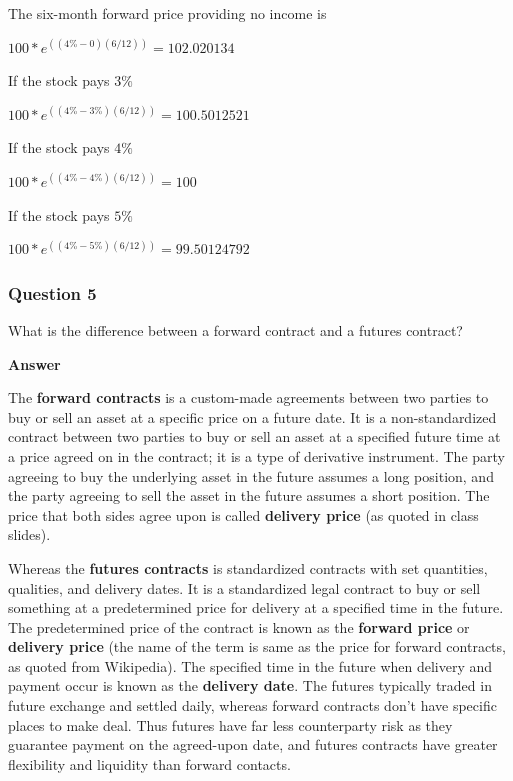 \documentclass[margin=1in]{article}
\begin{document}
		  The six-month forward price providing no income is
		  
		  $100*e^{((4\%-0)(6/12))}=102.020134$
		  
		  If the stock pays $3\%$
		  
		  $100*e^{((4\%-3\%)(6/12))}=100.5012521$
		  
		   If the stock pays $4\%$
		  
		  $100*e^{((4\%-4\%)(6/12))}=100$
		  
		   If the stock pays $5\%$
		  
		  $100*e^{((4\%-5\%)(6/12))}=99.50124792$
		  
		   \pagebreak
		  \subsubsection*{Question 5}
		  What is the difference between a forward contract and a futures contract?
		  
		  \textbf{Answer}
		  
		  The \textbf{forward contracts} is a custom-made agreements between two parties to buy or sell an asset at a specific price on a future date. It is a non-standardized contract between two parties to buy or sell an asset at a specified future time at a price agreed on in the contract; it is a type of derivative instrument. The party agreeing to buy the underlying asset in the future assumes a long position, and the party agreeing to sell the asset in the future assumes a short position. The price that both sides agree upon is called \textbf{delivery price} (as quoted in class slides).
		  
		  Whereas the \textbf{futures contracts} is standardized contracts with set quantities, qualities, and delivery dates. It is a standardized legal contract to buy or sell something at a predetermined price for delivery at a specified time in the future. The predetermined price of the contract is known as the \textbf{forward price} or \textbf{delivery price} (the name of the term is same as the price for forward contracts, as quoted from Wikipedia). The specified time in the future when delivery and payment occur is known as the \textbf{delivery date}. The futures typically traded in future exchange and settled daily, whereas forward contracts don't have specific places to make deal. Thus futures have far less counterparty risk as they guarantee payment on the agreed-upon date, and futures contracts have greater flexibility and liquidity than forward contacts.
		  
\end{document}
